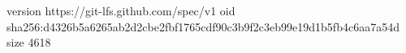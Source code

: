version https://git-lfs.github.com/spec/v1
oid sha256:d4326b5a6265ab2d2cbe2fbf1765cdf90c3b9f2c3eb99e19d1b5fb4c6aa7a54d
size 4618
